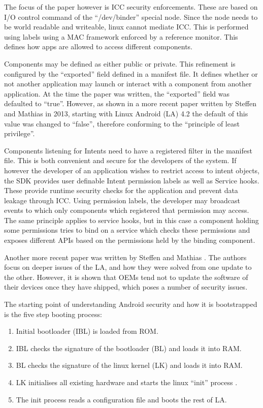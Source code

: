 The focus of the paper however is ICC security enforcements. These are based on I/O control command of the ``/dev/binder'' special node. Since the node needs to be world readable and writeable, linux cannot mediate ICC. This is performed using labels using a MAC framework enforced by a reference monitor. This defines how apps are allowed to access different components.

Components may be defined as either public or private. This refinement is configured by the ``exported'' field defined in a manifest file. It defines whether or not another application may launch or interact with a component from another application. At the time the paper was written, the ``exported'' field was defaulted to ``true''. However, as shown in a more recent paper \cite{liebergeld2013android} written by Steffen and Mathias in 2013, starting with Linux Android (LA) 4.2  the default of this value was changed to ``false'', therefore conforming to the ``principle of least privilege''.

Components listening for Intents need to have a registered filter in the manifest file. This is both convenient and secure for the developers of the system. If however the developer of an application wishes to restrict access to intent objects, the SDK provides user definable Intent permission labels as well as Service hooks. These provide runtime security checks for the application and prevent data leakage through ICC. Using permission labels, the developer may broadcast events to which only components which registered that permission may access. The same principle applies to service hooks, but in this case a component holding some permissions tries to bind on a service which checks these permissions and exposes different APIs based on the permissions held by the binding component.

Another more recent paper was written by Steffen and Mathias \cite{liebergeld2013android}. The authors focus on deeper issues of the LA, and how they were solved from one update to the other. However, it is shown that OEMs tend not to update the software of their devices once they have shipped, which poses a number of security issues.

The starting point of understanding Android security and how it is bootstrapped is the five step booting process:
\begin{enumerate}
	\item Initial bootloader (IBL) is loaded from ROM.
	\item IBL checks the signature of the bootloader (BL) and loads it into RAM.
	\item BL checks the signature of the linux kernel (LK) and loads it into RAM.
	\item LK initialises all existing hardware and starts the linux ``init'' process \cite{SPECIFY WHAT THIS IS FROM PAPER}.
	\item The init process reads a configuration file and boots the rest of LA.
\end{enumerate}

